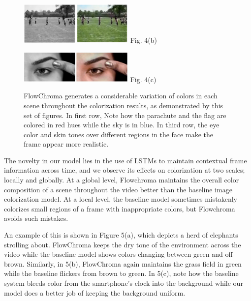 \documentclass[10pt,twocolumn,letterpaper]{article}
\begin{document}
\begin{figure}[!h]
  \centering
  \includegraphics[width=0.5\textwidth]{bw-fc-fifa.jpg}
  \label{}{\footnotesize Fig. 4(b)}
\end{figure}

\begin{figure}[!h]
  \centering
  \includegraphics[width=0.5\textwidth]{bw-fc-lady-face.jpg}
  \label{}{\footnotesize Fig. 4(c)}
  \caption{FlowChroma generates a considerable variation of colors in each scene throughout the colorization results, as demonstrated by this set of figures. In first row, Note how the parachute and the flag are colored in red hues while the sky is in blue. In third row, the eye color and skin tones over different regions in the face make the frame appear more realistic.}
\end{figure}

The novelty in our model lies in the use of LSTMs to maintain contextual frame information across time, and we observe its effects on colorization at two scales;  locally and globally. At a global level, Flowchroma maintains the overall color composition of a scene throughout the video better than the baseline image colorization model. At a local level, the baseline model sometimes mistakenly colorizes small regions of a frame with inappropriate colors, but Flowchroma avoids such mistakes.

An example of this is shown in Figure 5(a), which depicts a herd of elephants strolling about. FlowChroma keeps the dry tone of the environment across the video while the baseline model shows colors changing between green and off-brown. Similarly, in 5(b), FlowChroma again maintains the grass field in green while the baseline flickers from brown to green. In 5(c), note how the baseline system bleeds color from the smartphone’s clock into the background while our model does a better job of keeping the background uniform. 
\end{document}
